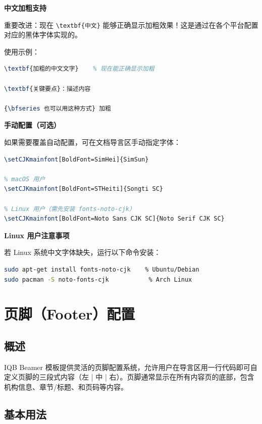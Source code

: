 \textbf{中文加粗支持}

重要改进：现在 \lstinline|\textbf{中文}| 能够正确显示加粗效果！这是通过在各个平台配置对应的黑体字体实现的。

使用示例：

\begin{lstlisting}[style=blockstyle,language=TeX]
\textbf{加粗的中文文字}    % 现在能正确显示加粗

\textbf{关键要点}：描述内容

{\bfseries 也可以用这种方式} 加粗
\end{lstlisting}

\textbf{手动配置（可选）}

如果需要覆盖自动配置，可在文档导言区手动指定字体：

\begin{lstlisting}[style=blockstyle,language=TeX]
% Windows 用户
\setCJKmainfont[BoldFont=SimHei]{SimSun}

% macOS 用户
\setCJKmainfont[BoldFont=STHeiti]{Songti SC}

% Linux 用户（需先安装 fonts-noto-cjk）
\setCJKmainfont[BoldFont=Noto Sans CJK SC]{Noto Serif CJK SC}
\end{lstlisting}

\textbf{Linux 用户注意事项}

若 Linux 系统中文字体缺失，运行以下命令安装：

\begin{lstlisting}[style=blockstyle,language=bash]
sudo apt-get install fonts-noto-cjk    % Ubuntu/Debian
sudo pacman -S noto-fonts-cjk           % Arch Linux
\end{lstlisting}

\section{页脚（Footer）配置}
\label{sec:footer-config}

\subsection{概述}

IQB Beamer 模板提供灵活的页脚配置系统，允许用户在导言区用一行代码即可自定义页脚的三段式内容（左 | 中 | 右）。页脚通常显示在所有内容页的底部，包含机构信息、章节/标题、和页码等内容。

\subsection{基本用法}

